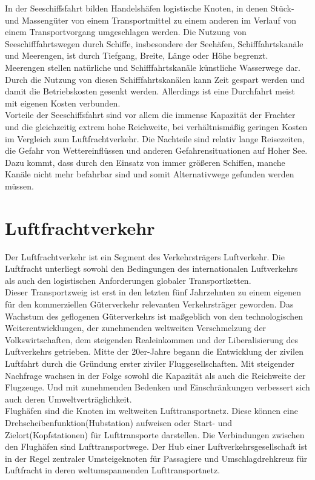 \documentclass[a4paper,12pt]{scrreprt}
\begin{document}
	In der Seeschiffsfahrt bilden Handelshäfen logistische Knoten, in denen Stück- und Massengüter von einem Transportmittel zu einem anderen im Verlauf von einem Transportvorgang umgeschlagen werden. Die Nutzung von Seeschifffahrtswegen durch Schiffe, insbesondere der Seehäfen, Schifffahrtskanäle und Meerengen, ist durch Tiefgang, Breite, Länge oder Höhe begrenzt. Meerengen stellen natürliche und Schifffahrtskanäle künstliche Wasserwege dar. Durch die Nutzung von diesen Schifffahrtskanälen kann Zeit gespart werden und damit die Betriebskosten gesenkt werden. Allerdings ist eine Durchfahrt meist mit eigenen Kosten verbunden.\\
	
	Vorteile der Seeschiffsfahrt sind vor allem die immense Kapazität der Frachter und die gleichzeitig extrem hohe Reichweite, bei verhältnismäßig geringen Kosten im Vergleich zum Luftfrachtverkehr. Die Nachteile sind relativ lange Reisezeiten, die Gefahr von Wettereinflüssen  und anderen Gefahrensituationen auf Hoher See. Dazu kommt, dass durch den Einsatz von immer größeren Schiffen, manche Kanäle nicht mehr befahrbar sind und somit Alternativwege gefunden werden müssen. 
	
	\section{Luftfrachtverkehr}
	Der Luftfrachtverkehr ist ein Segment des Verkehrsträgers Luftverkehr. Die Luftfracht unterliegt sowohl den Bedingungen des internationalen Luftverkehrs als auch den logistischen Anforderungen globaler Transportketten. \\
	
	Dieser Transportzweig ist erst in den letzten fünf Jahrzehnten zu einem eigenen für den kommerziellen Güterverkehr relevanten Verkehrsträger geworden. Das Wachstum des geflogenen Güterverkehrs ist maßgeblich von den technologischen Weiterentwicklungen, der zunehmenden weltweiten Verschmelzung der Volkswirtschaften, dem steigenden Realeinkommen und der Liberalisierung des Luftverkehrs getrieben. Mitte der 20er-Jahre begann die Entwicklung der zivilen Luftfahrt durch die Gründung erster ziviler Fluggesellschaften. Mit steigender Nachfrage wachsen in der Folge sowohl die Kapazität als auch die Reichweite der Flugzeuge. Und mit zunehmenden Bedenken und Einschränkungen verbessert sich auch deren Umweltverträglichkeit.\\
	
	Flughäfen sind die Knoten im weltweiten Lufttransportnetz. Diese können eine Drehscheibenfunktion(Hubstation) aufweisen oder Start- und Zielort(Kopfstationen) für Lufttransporte darstellen. Die Verbindungen zwischen den Flughäfen sind Lufttransportwege. Der Hub einer Luftverkehrsgesellschaft ist in der Regel zentraler Umsteigeknoten für Passagiere und Umschlagdrehkreuz für Luftfracht in deren weltumspannenden Lufttransportnetz. \\
	
\end{document}
